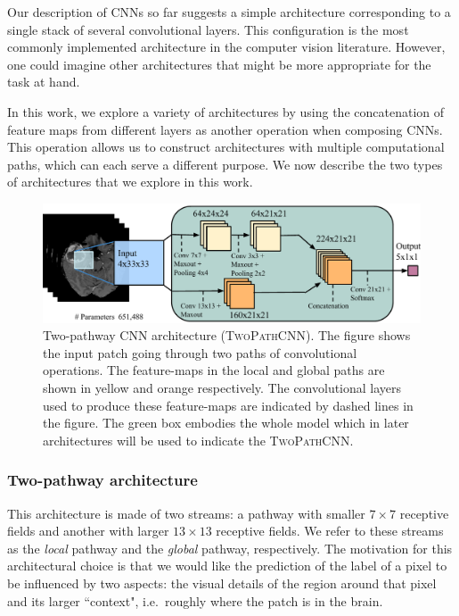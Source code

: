 \documentclass[final,5p,times,twocolumn]{elsarticle}
\begin{document}

Our description of CNNs so far suggests a simple architecture corresponding to a single stack of several convolutional layers. This configuration is the most commonly implemented architecture in the computer vision literature. However, one could imagine other architectures that might be more appropriate for the task at hand.

In this work, we explore a variety of architectures by using the concatenation of feature maps from different layers as another operation when composing CNNs. This operation allows us to construct architectures with multiple computational paths, which can each serve a different purpose.  We now describe the two types of architectures that we explore in this work.

\begin{figure}
\centering
\includegraphics[width=0.75 \linewidth]{MICCAI_Basic_Model.pdf}
\caption{Two-pathway CNN architecture (\textsc{TwoPathCNN}). The figure shows the input patch going through two paths of convolutional operations. The feature-maps in the local and global paths are shown in yellow and orange respectively. The convolutional layers used to produce these feature-maps are indicated by dashed lines in the figure. The green box embodies the whole model which in later architectures will be used to indicate the \textsc{TwoPathCNN}.}
\label{fig:basicmodel}
\end{figure}


\subsubsection{Two-pathway architecture}
\label{sec::twoPAths}

This architecture is made of two streams: a pathway with smaller $7\times7$ receptive fields and another with larger $13\times13$ receptive fields. We refer to these streams as the {\em local} pathway and the {\em global} pathway, respectively. The motivation for this architectural choice is that we would like the prediction of the label of a pixel to be influenced by two aspects: the visual details of the region around that pixel and its larger ``context", i.e.\ roughly where the patch is in the brain. 
\end{document}
